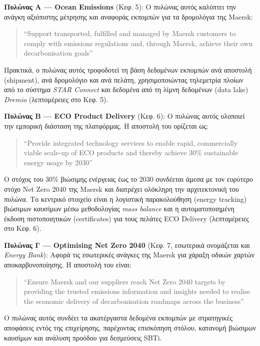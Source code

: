 \textbf{Πυλώνας Α --- Ocean Emissions} (Κεφ. 5): Ο πυλώνας αυτός
καλύπτει την ανάγκη αξιόπιστης μέτρησης και αναφοράς εκπομπών για τα
δρομολόγια της Maersk:

\begin{quote}
``Support transported, fulfilled and managed by Maersk customers to
comply with emissions regulations and, through Maersk, achieve their own
decarbonisation goals''
\end{quote}

Πρακτικά, ο πυλώνας αυτός τροφοδοτεί τη βάση δεδομένων εκπομπών ανά
αποστολή (shipment), ανά δρομολόγιο και ανά πελάτη, χρησιμοποιώντας
τηλεμετρία πλοίων από το σύστημα \emph{STAR Connect} και δεδομένα από τη
λίμνη δεδομένων (data lake) \emph{Dremio} (λεπτομέρειες στο Κεφ. 5).

\textbf{Πυλώνας Β --- ECO Product Delivery} (Κεφ. 6): Ο πυλώνας αυτός
υλοποιεί την εμπορική διάσταση της πλατφόρμας. Η αποστολή του ορίζεται
ως:

\begin{quote}
``Provide integrated technology services to enable rapid, commercially
viable scale-up of ECO products and thereby achieve 30\% sustainable
energy usage by 2030''
\end{quote}

Ο στόχος του 30\% βιώσιμης ενέργειας έως το 2030 συνδέεται άμεσα με τον
ευρύτερο στόχο Net Zero 2040 της Maersk και διατρέχει ολόκληρη την
αρχιτεκτονική του πυλώνα. Το κεντρικό στοιχείο είναι η λογιστική
παρακολούθηση (energy tracking) βιώσιμων καυσίμων μέσω μεθοδολογίας
\emph{mass balance} και η αυτοματοποιημένη έκδοση πιστοποιητικών
(certificates) για τους πελάτες ECO Delivery (λεπτομέρειες στο Κεφ. 6).

\textbf{Πυλώνας Γ --- Optimising Net Zero 2040} (Κεφ. 7, εσωτερικά
ονομάζεται και \emph{Energy Bank}): Αφορά τις εσωτερικές ανάγκες της
Maersk για χάραξη οδικών χαρτών αποκαρβονοποίησης. Η αποστολή του είναι:

\begin{quote}
``Ensure Maersk and our suppliers reach Net Zero 2040 targets by
providing the trusted emissions information and insights needed to
realise the economic delivery of decarbonisation roadmaps across the
business''
\end{quote}

Ο πυλώνας αυτός συνδέει τα ακατέργαστα δεδομένα εκπομπών με στρατηγικές
αποφάσεις εντός της επιχείρησης, παρέχοντας επισκόπηση στόλου, κατανομή
βιώσιμων καυσίμων και ανάλυση προόδου για δεσμεύσεις SBTi.

